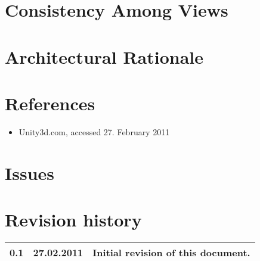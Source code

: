 \documentclass[titlepage,a4paper,11pt]{article}
\begin{document}
\section{Consistency Among Views}


\section{Architectural Rationale}



\section{References}
\begin{itemize}
  \item Unity3d.com, accessed 27. February 2011
\end{itemize}

\section{Issues}
\section{Revision history}

\begin{table}[H]
  \begin{tabular}{| c | c | c |}
    \hline
    0.1 & 27.02.2011 & Initial revision of this document. \\
    \hline
  \end{tabular}
\end{table}
\end{document}
